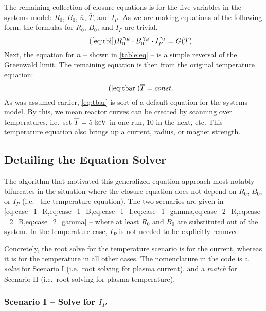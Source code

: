The remaining collection of closure equations is for the five  variables in the systems model: $R_0$, $B_0$, $\overline n$, $\overline T$, and $I_P$. As we are making equations of the following form, the formulas for $R_0$, $B_0$, and $I_P$ are trivial.
\begin{equation}
	\tag{\ref{eq:rbi}}
	R_0^{\, \gamma_R} \cdot B_0^{\, \gamma_B} \cdot I_P^{\, \gamma_I} = G( \overline T )
\end{equation}
Next, the equation for $\overline n$ -- shown in \cref{table:eq} -- is a simple reversal of the Greenwald limit. The remaining equation is then from the original temperature equation:
\begin{equation}
	\tag{\ref{eq:tbar}}
	\overline T = const.
\end{equation}
As was assumed earlier, \cref{eq:tbar} is sort of a default equation for the systems model. By this, we mean reactor curves can be created by scanning over temperatures, i.e.\ set $\overline T = 5 \ \textnormal{keV}$ in one run, 10 in the next, etc. This temperature equation also brings up a  current, radius, or magnet strength. 

\subsection{Detailing the Equation Solver}

The algorithm that motivated this generalized equation approach most notably bifurcates in the situation where the closure equation does not depend on $R_0$, $B_0$, or $I_P$ (i.e.\  the temperature equation). The two scenarios are given in \cref{eq:case_1_R,eq:case_1_B,eq:case_1_I,eq:case_1_gamma,eq:case_2_R,eq:case_2_B,eq:case_2_gamma} -- where at least $R_0$ and $B_0$ are substituted out of the system. In the temperature case, $I_P$ is not needed to be explicitly removed.

Concretely, the root solve for the temperature  scenario is for the current, whereas it is for the temperature in all other cases. The nomenclature in the code is a \emph{solve} for Scenario I (i.e.\ root solving for plasma current), and a \emph{match} for Scenario II (i.e.\ root solving for plasma temperature).

\subsubsection{Scenario I -- Solve for $I_P$}

